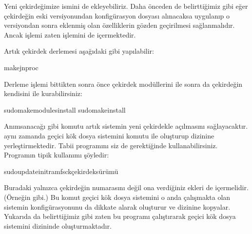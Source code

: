 \documentclass[a4paper,10pt,turkish]{sphinxmanual}
\begin{document}
\sphinxAtStartPar
Yeni çekirdeğimize  ismini de ekleyebiliriz. Daha önceden de belirttiğimiz gibi eğer
çekirdeğin eski versiyonundan konfigürasyon dosyası alınacaksa  uygulanıp o
versiyondan sonra eklenmiş olan özelliklerin gözden geçirilmesi sağlanmalıdır. Ancak 
işlemi zaten  işlemini de içermektedir.

\sphinxAtStartPar
{} Artık çekirdek derlemesi aşağıdaki gibi yapılabilir:

\begin{sphinxVerbatim}[commandchars=\\\{\}]
\PYGZdl{}make\PYGZhy{}jnproc
\end{sphinxVerbatim}

\sphinxAtStartPar
{} Derleme işlemi bittikten sonra önce çekirdek modüllerini  ile
sonra da çekirdeğin kendisini  ile kurabilirsiniz:

\begin{sphinxVerbatim}[commandchars=\\\{\}]
\PYGZdl{}sudomakemodules\PYGZus{}install
\PYGZdl{}sudomakeinstall
\end{sphinxVerbatim}

\sphinxAtStartPar
Anımsanacağı gibi  komutu artık sistemin yeni çekirdekle açılmasını sağlayacaktır.
 aynı zamanda geçici kök dosya sistemini  komutu ile oluşturup
 dizinine yerleştirmektedir. Tabii  programını siz de gerektiğinde
kullanabilirsiniz. Programın tipik kullanımı şöyledir:

\begin{sphinxVerbatim}[commandchars=\\\{\}]
\PYGZdl{}sudoupdate\PYGZhy{}initramfs\PYGZhy{}c\PYGZhy{}k\PYGZlt{}çekirdek\PYGZus{}sürümü\PYGZgt{}
\end{sphinxVerbatim}

\sphinxAtStartPar
Buradaki  yalnızca çekirdeğin numarasını değil ona verdiğiniz ekleri de içermelidir.
(Örneğin  gibi.) Bu komut geçici kök dosya sistemini o anda çalışmakta olan sistemin
konfigürasyonunu da dikkate alarak oluşturur ve  dizinine kopyalar. Yukarıda da belirttiğimiz
gibi  zaten bu programı çalıştırarak geçici kök dosya sistemini  dizininde
oluşturmaktadır.
\end{document}
